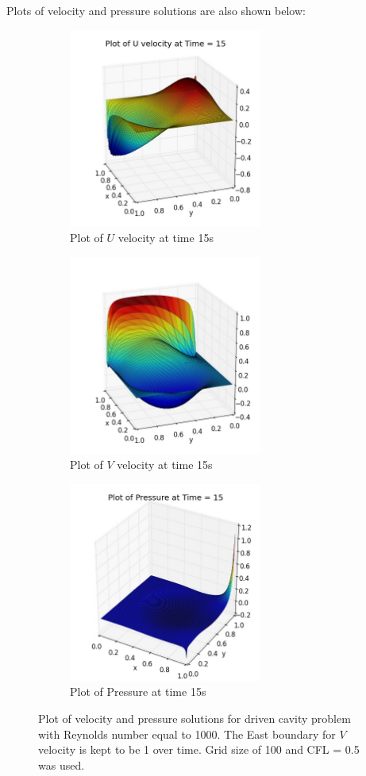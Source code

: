 Plots of velocity and pressure solutions are also shown below:
\begin{figure}[H]
	\centering
	\begin{subfigure}[t]{2.5in}
		\centering
		\includegraphics[width=2.5in]{figures/Gauge_dcv_uf_grid_120.jpg}
		\caption{Plot of $U$ velocity at time 15s}\label{fig:6.19a}		
	\end{subfigure}
	\quad
	\begin{subfigure}[t]{2.5in}
		\centering
		\includegraphics[width=2.5in]{figures/Gauge_dcv_vf_grid_120.jpg}
		\caption{Plot of $V$ velocity at time 15s}\label{fig:6.19b}
	\end{subfigure}
	\quad
	\centering
	\begin{subfigure}[t]{3.5in}
		\centering
		\includegraphics[width=2.5in]{figures/Gauge_dcv_pf_grid_120.jpg}
		\caption{Plot of Pressure at time 15s}\label{fig:6.19a}		
	\end{subfigure}
	\caption{Plot of velocity and pressure solutions for driven cavity problem with Reynolds number equal to 1000. The East boundary for $V$ velocity is kept to be 1 over time. Grid size of 100 and CFL = 0.5 was used.}\label{fig:6.16}
\end{figure}

